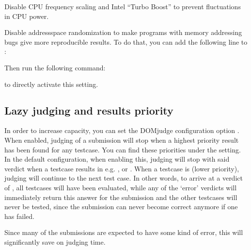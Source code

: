 \documentclass[a4paper,10pt,english,openany]{sphinxmanual}
\begin{document}
\sphinxAtStartPar
Disable CPU frequency scaling and Intel “Turbo Boost” to
prevent fluctuations in CPU power.

\sphinxAtStartPar
Disable address\sphinxhyphen{}space randomization to make programs with
memory addressing bugs give more reproducible results. To
do that, you can add the following line to :

\begin{sphinxVerbatim}[commandchars=\\\{\}]
\end{sphinxVerbatim}

\sphinxAtStartPar
Then run the following command:

\begin{sphinxVerbatim}[commandchars=\\\{\}]
  
\end{sphinxVerbatim}

\sphinxAtStartPar
to directly activate this setting.


\subsection{Lazy judging and results priority}
\label{\detokenize{judging:lazy-judging-and-results-priority}}
\sphinxAtStartPar
In order to increase capacity, you can set the DOMjudge configuration option
. When enabled, judging of a submission will stop when
a highest priority result has been found for any testcase. You can find these
priorities under the  setting. In the default configuration,
when enabling this, judging will stop with said verdict when a testcase
results in e.g. ,  or . When a testcase
is  (lower priority), judging will continue to the next test case.
In other words, to arrive at a verdict of , all testcases will have
been evaluated, while any of the ‘error’ verdicts will immediately return this
answer for the submission and the other testcases will never be tested, since
the submission can never become correct anymore if one has failed.

\sphinxAtStartPar
Since many of the submissions are expected to have some kind of error, this
will significantly save on judging time.
\end{document}
